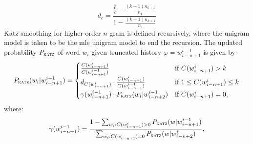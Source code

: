 	\begin{equation}
		d_{c}=\frac{\frac{\hat{c}}{c}-\frac{(k+1)n_{k+1}}{n_{1}}}{1-\frac{(k+1)n_{k+1}}{n_{1}}}
		\label{equation:dc}
	\end{equation}
	Katz smoothing for higher-order \mbox{$n$-gram} is defined recursively, where the unigram model is taken to be the \gls{mle} unigram model to end the recursion. The updated probability $P_{\textsc{katz}}$ of word $w_{i}$ given truncated history $\varphi=w_{i-n+1}^{i-1}$ is given by
	\begin{equation}
		P_{\textsc{katz}}(w_{i}|w_{i-n+1}^{i-1})=
		\begin{cases}
			\frac{C(w_{i-n+1}^{i})}{C(w_{i-n+1}^{i-1})}& \text{if }C(w_{i-n+1}^{i}) > k\\
			d_{C(w_{i-n+1}^{i})}\cdot \frac{C(w_{i-n+1}^{i})}{C(w_{i-n+1}^{i-1})}& \text{if } 1\leq C(w_{i-n+1}^{i})\leq k\\
			\gamma(w_{i-n+1}^{i-1})\cdot P_{\textsc{katz}}(w_{i}|w_{i-n+2}^{i-1})& \text{if } C(w_{i-n+1}^{i})=0,
		\end{cases}
	\end{equation}
	where:
	\begin{equation}
		\gamma(w_{i-n+1}^{i-1})=\frac{1-\sum_{w_{i}:C(w_{i-n+1}^{i})>0}P_{\textsc{katz}}(w|w_{i-n+1}^{i-1})}{\sum_{w_{i}:C(w_{i-n+1}^{i})=0}P_{\textsc{katz}}(w|w_{i-n+2}^{i})}.
	\end{equation}
